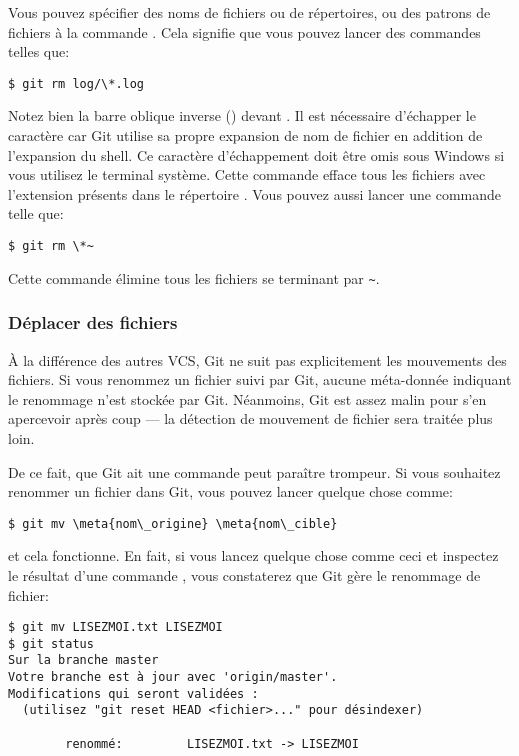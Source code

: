 Vous pouvez spécifier des noms de fichiers ou de répertoires, ou des patrons de fichiers à la commande .
Cela signifie que vous pouvez lancer des commandes telles que:
\begin{Schunk}
\begin{Verbatim}
$ git rm log/\*.log
\end{Verbatim}
\end{Schunk}

Notez bien la barre oblique inverse (\code{\bs}) devant \code{*}.
Il est nécessaire d'échapper le caractère \code{*} car Git utilise sa propre expansion de nom de fichier en addition de l'expansion du shell. Ce caractère d'échappement doit être omis sous Windows si vous utilisez le terminal système.
Cette commande efface tous les fichiers avec l'extension  présents dans le répertoire .
Vous pouvez aussi lancer une commande telle que:
\begin{Schunk}
\begin{Verbatim}
$ git rm \*~
\end{Verbatim}
\end{Schunk}

Cette commande élimine tous les fichiers se terminant par \verb=~=.

\subsubsection{Déplacer des fichiers}
\label{sec:git:mv}

À la différence des autres VCS, Git ne suit pas explicitement les mouvements des fichiers.
Si vous renommez un fichier suivi par Git, aucune méta-donnée indiquant le renommage n'est stockée par Git.
Néanmoins, Git est assez malin pour s'en apercevoir après coup --- la détection de mouvement de fichier sera traitée plus loin.

De ce fait, que Git ait une commande  peut paraître trompeur.
Si vous souhaitez renommer un fichier dans Git, vous pouvez lancer quelque chose comme:
\begin{Schunk}
\begin{Verbatim}[commandchars=\\\{\}]
$ git mv \meta{nom\_origine} \meta{nom\_cible}
\end{Verbatim}
\end{Schunk}
et cela fonctionne.
En fait, si vous lancez quelque chose comme ceci et inspectez le résultat d'une commande , vous constaterez que Git gère le renommage de fichier:
\begin{Schunk}
\begin{Verbatim}
$ git mv LISEZMOI.txt LISEZMOI
$ git status
Sur la branche master
Votre branche est à jour avec 'origin/master'.
Modifications qui seront validées :
  (utilisez "git reset HEAD <fichier>..." pour désindexer)

        renommé:         LISEZMOI.txt -> LISEZMOI
\end{Verbatim}
\end{Schunk}

